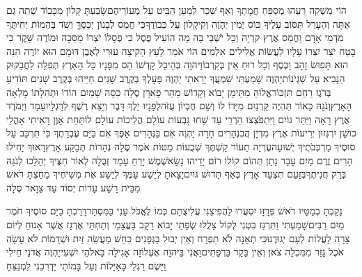 \documentclass[../main/main.tex]{subfiles}
\begin{document}
\begin{multicols}{\ncols}
הוֹי מַשְׁקֵה רֵעֵהוּ מְסַפֵּחַ חֲמָתְךָ וְאַף שַׁכֵּר לְמַעַן הַבִּיט עַל מְעוֹרֵיהֶם\PreVerseSpace{}שָׂבַעְתָּ קָלוֹן מִכָּבוֹד שְׁתֵה גַם אַתָּה וְהֵעָרֵל תִּסּוֹב עָלֶיךָ כּוֹס יְמִין יַהְוֶה וְקִיקָלוֹן עַל כְּבוֹדֶךָ\PreVerseSpace{}כִּי חֲמַס לְבָנוֹן יְכַסֶּךָּ וְשֹׁד בְּהֵמוֹת יְחִיתֶּךָ\SubEnd{} מִדְּמֵי אָדָם וַחֲמַס אֶרֶץ קִרְיָה וְכָל יֹשְׁבֵי בָהּ \ClosedSection{}מָה הוֹעִיל פֶּסֶל כִּי פְסָלוֹ יֹצְרוֹ מַסֵּכָה וּמוֹרֶה שָּׁקֶר כִּי בָטַח יֹצֵר יִצְרוֹ עָלָיו לַעֲשׂוֹת אֱלִילִים אִלְּמִים \ClosedSection{}הוֹי אֹמֵר לָעֵץ הָקִיצָה עוּרִי לְאֶבֶן דּוּמָם הוּא יוֹרֶה הִנֵּה הוּא תָּפוּשׂ זָהָב וָכֶסֶף וְכָל רוּחַ אֵין בְּקִרְבּוֹ\PreVerseSpace{}וַיהוָה בְּהֵיכַל קָדְשׁוֹ הַס מִפָּנָיו כָּל הָאָרֶץ \ClosedSection{}תְּפִלָּה לַחֲבַקּוּק הַנָּבִיא עַל שִׁגְיֹנוֹת\PreVerseSpace{}יַהְוֶה שָׁמַעְתִּי שִׁמְעֲךָ יָרֵאתִי יַהְוֶה פָּעָלְךָ בְּקֶרֶב שָׁנִים חַיֵּיהוּ בְּקֶרֶב שָׁנִים תּוֹדִיעַ בְּרֹגֶז רַחֵם תִּזְכּוֹר\PreVerseSpace{}אֱלוֹהַּ מִתֵּימָן יָבוֹא וְקָדוֹשׁ מֵהַר פָּארָן סֶלָה כִּסָּה שָׁמַיִם הוֹדוֹ וּתְהִלָּתוֹ מָלְאָה הָאָרֶץ\PreVerseSpace{}וְנֹגַהּ כָּאוֹר תִּהְיֶה קַרְנַיִם מִיָּדוֹ לוֹ וְשָׁם חֶבְיוֹן עֻזֹּה\PreVerseSpace{}לְפָנָיו יֵלֶךְ דָּבֶר וְיֵצֵא רֶשֶׁף לְרַגְלָיו\PreVerseSpace{}עָמַד וַיְמֹדֶד אֶרֶץ רָאָה וַיַּתֵּר גּוֹיִם וַיִּתְפֹּצְצוּ הַרְרֵי עַד שַׁחוּ גִּבְעוֹת עוֹלָם הֲלִיכוֹת עוֹלָם לוֹ\PreVerseSpace{}תַּחַת אָוֶן רָאִיתִי אָהֳלֵי כוּשָׁן יִרְגְּזוּן יְרִיעוֹת אֶרֶץ מִדְיָן \ClosedSection{}הֲבִנְהָרִים חָרָה יַהְוֶה אִם בַּנְּהָרִים אַפֶּךָ אִם בַּיָּם עֶבְרָתֶךָ כִּי תִרְכַּב עַל סוּסֶיךָ מַרְכְּבֹתֶיךָ יְשׁוּעָה\PreVerseSpace{}עֶרְיָה תֵעוֹר קַשְׁתֶּךָ שְׁבֻעוֹת מַטּוֹת אֹמֶר סֶלָה נְהָרוֹת תְּבַקַּע אָרֶץ\PreVerseSpace{}רָאוּךָ יָחִילוּ הָרִים זֶרֶם מַיִם עָבָר נָתַן תְּהוֹם קוֹלוֹ רוֹם יָדֵיהוּ נָשָׂא\PreVerseSpace{}שֶׁמֶשׁ יָרֵחַ עָמַד זְבֻלָה לְאוֹר חִצֶּיךָ יְהַלֵּכוּ לְנֹגַהּ בְּרַק חֲנִיתֶךָ\PreVerseSpace{}בְּזַעַם תִּצְעַד אָרֶץ בְּאַף תָּדוּשׁ גּוֹיִם\PreVerseSpace{}יָצָאתָ לְיֵשַׁע עַמֶּךָ לְיֵשַׁע אֶת מְשִׁיחֶיךָ מָחַצְתָּ רֹּאשׁ מִבֵּית רָשָׁע עָרוֹת יְסוֹד עַד צַוָּאר סֶלָה\OpenSection{}\par
{}נָקַבְתָּ בְמַטָּיו רֹאשׁ פְּרָזָו יִסְעֲרוּ לַהֲפִיצֵנִי עֲלִיצֻתָם כְּמוֹ לֶאֱכֹל עָנִי בַּמִּסְתָּר\PreVerseSpace{}דָּרַכְתָּ בַיָּם סוּסֶיךָ חֹמֶר מַיִם רַבִּים\PreVerseSpace{}שָׁמַעְתִּי וַתִּרְגַּז בִּטְנִי לְקוֹל צָלֲלוּ שְׂפָתַי יָבוֹא רָקָב בַּעֲצָמַי וְתַחְתַּי אֶרְגָּז אֲשֶׁר אָנוּחַ לְיוֹם צָרָה לַעֲלוֹת לְעַם יְגוּדֶנּוּ\PreVerseSpace{}כִּי תְאֵנָה לֹא תִפְרָח וְאֵין יְבוּל בַּגְּפָנִים כִּחֵשׁ מַעֲשֵׂה זַיִת וּשְׁדֵמוֹת לֹא עָשָׂה אֹכֶל גָּזַר מִמִּכְלָה צֹאן וְאֵין בָּקָר בָּרְפָתִים\PreVerseSpace{}וַאֲנִי בַּיהוָה אֶעְלוֹזָה אָגִילָה בֵּאלֹהֵי יִשְׁעִי\PreVerseSpace{}יַהְוֶה אֲדֹנַי חֵילִי וַיָּשֶׂם רַגְלַי כָּאַיָּלוֹת וְעַל בָּמוֹתַי יַדְרִכֵנִי לַמְנַצֵּחַ\par
\pagebreak
\end{multicols}
\end{document}
